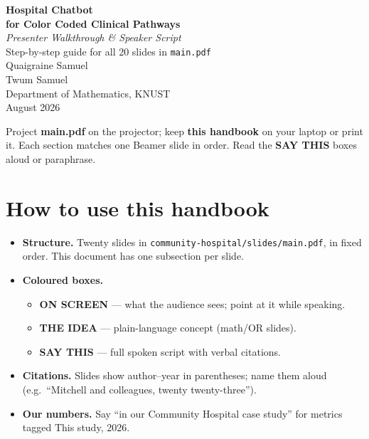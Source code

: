 \documentclass[11pt]{article}
\begin{document}
\begin{titlepage}
\centering
\vspace*{2.5cm}
{\Huge\bfseries\color{knustGreen} Hospital Chatbot}\\[0.3cm]
{\LARGE\bfseries for Color Coded Clinical Pathways}\\[1cm]
{\Large\itshape Presenter Walkthrough \& Speaker Script}\\[0.5cm]
{\large Step-by-step guide for all 20 slides in \texttt{main.pdf}}\\[2cm]
{\large Quaigraine Samuel \\ Twum Samuel}\\[0.3cm]
{\large Department of Mathematics, KNUST}\\[0.3cm]
{\large August 2026}\\[1.5cm]
\begin{tcolorbox}[width=0.88\textwidth, colback=knustSand, colframe=knustGreen, arc=4pt]
\small\centering
Project \textbf{main.pdf} on the projector; keep \textbf{this handbook} on your laptop or print it.
Each section matches one Beamer slide in order. Read the \textbf{SAY THIS} boxes aloud or paraphrase.
\end{tcolorbox}
\end{titlepage}

\tableofcontents
\newpage

\section{How to use this handbook}

\begin{itemize}
  \item \textbf{Structure.} Twenty slides in \texttt{community-hospital/slides/main.pdf}, in fixed order.
        This document has one subsection per slide.
  \item \textbf{Coloured boxes.}
    \begin{itemize}
      \item \textbf{ON SCREEN} --- what the audience sees; point at it while speaking.
      \item \textbf{THE IDEA} --- plain-language concept (math/OR slides).
      \item \textbf{SAY THIS} --- full spoken script with verbal citations.
    \end{itemize}
  \item \textbf{Citations.} Slides show author--year in parentheses; name them aloud
        (e.g.\ ``Mitchell and colleagues, twenty twenty-three'').
  \item \textbf{Our numbers.} Say ``in our Community Hospital case study'' for metrics tagged This study, 2026.
\end{itemize}
\end{document}
